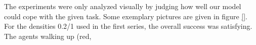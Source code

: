 
\noi The experiments were only analyzed visually by judging how well our model could cope with the given task. Some exemplary pictures are given in figure \ref{}.\\

\noi For the densities 0.2/1 used in the first series, the overall success was satisfying. The agents walking up (red, 

